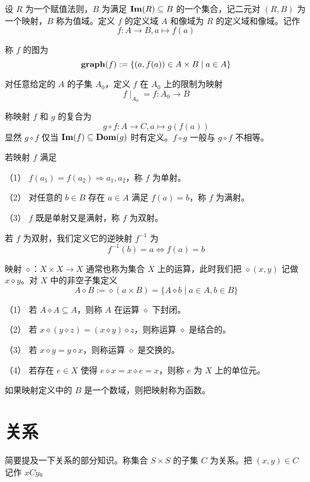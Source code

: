 \begin{definition}
	设 $R$ 为一个赋值法则，$B$ 为满足 $\operatorname{\mathbf{Im}}(R) \subseteq B$ 的一个集合，记二元对 $(R,B)$ 为一个映射，$B$ 称为值域。定义 $f$ 的定义域 $A$ 和像域为 $R$ 的定义域和像域。记作
	$$f:A\to B, a\mapsto f(a)$$
\end{definition}

称 $f$ 的图为
$$\operatorname{\mathbf{graph}}(f) := \{(a,f(a)) \in A\times B \mid a \in A\}$$

对任意给定的 $A$ 的子集 $A_0$，定义 $f$ 在 $A_0$ 上的限制为映射
$$f \mid_{A_0} = f : A_0 \to B$$

称映射 $f$ 和 $g$ 的复合为
$$g\circ f: A \to C, a \mapsto g(f(a))$$
显然 $g \circ f$ 仅当 $\operatorname{\mathbf{Im}}(f) \subseteq \operatorname{\mathbf{Dom}}(g)$ 时有定义。$f\circ g$ 一般与 $g \circ f$ 不相等。

若映射 $f$ 满足

（1） $f(a_1) = f(a_2) \Rightarrow a_1,a_2$，称 $f$ 为单射。

（2） 对任意的 $b\in B$ 存在 $a\in A$ 满足 $f(a)=b$，称 $f$ 为满射。

（3） $f$ 既是单射又是满射，称 $f$ 为双射。

若 $f$ 为双射，我们定义它的逆映射 $f^{-1}$ 为
$$f^{-1}(b) =  a \Leftrightarrow f(a) = b$$

映射 $\diamond$：$X\times X \to X$ 通常也称为集合 $X$ 上的运算，此时我们把 $\diamond(x,y)$ 记做 $x \diamond y$。对 $X$ 中的非空子集定义
$$A \diamond B := \diamond(a\times B) = \{A \diamond b \mid a \in A, b\in B\}$$

\begin{definition}
	（1） 若 $A \diamond A \subseteq A$，则称 $A$ 在运算 $\diamond$ 下封闭。

	（2） 若 $x \diamond (y \diamond z) = (x \diamond y) \diamond z$，则称运算 $\diamond$ 是结合的。

	（3） 若 $x \diamond y = y \diamond x$，则称运算 $\diamond$ 是交换的。

	（4） 若存在 $e \in X$ 使得 $e \diamond x = x \diamond e = x$，则称 $e$ 为 $X$ 上的单位元。
\end{definition}

如果映射定义中的 $B$ 是一个数域，则把映射称为函数。

\section{关系}

简要提及一下关系的部分知识。称集合 $S\times S$ 的子集 $C$ 为关系。把 $(x,y)\in C$ 记作 $xCy$。


